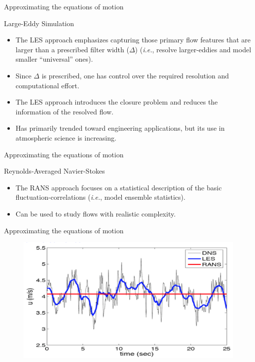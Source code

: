 
\begin{frame}{Approximating the equations of motion}

Large-Eddy Simulation
\begin{itemize}
	\item The LES approach emphasizes capturing those primary flow features that are larger than a prescribed filter width ($\Delta$) (\textit{i.e.}, resolve larger-eddies and model smaller ``universal'' ones).
	\item Since $\Delta$ is prescribed, one has control over the required resolution and computational effort.
	\item The LES approach introduces the closure problem and reduces the information of the resolved flow.
	\item Has primarily trended toward engineering applications, but its use in atmospheric science is increasing.
\end{itemize}

\end{frame}


\begin{frame}{Approximating the equations of motion}

Reynolds-Averaged Navier-Stokes
\begin{itemize}
	\item The RANS approach focuses on a statistical description of the basic fluctuation-correlations (\textit{i.e.}, model ensemble statistics).
	\item Can be used to study flows with realistic complexity.
\end{itemize}
\end{frame}


\begin{frame}{Approximating the equations of motion}
\begin{figure}
	\includegraphics[width=\textwidth]{methods1.png}
\end{figure}
\end{frame}


